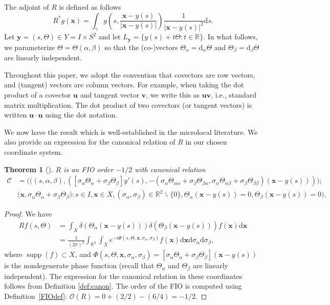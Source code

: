 \documentclass[11pt]{article}
\newcommand{\supp}{\operatorname{supp}}
\newcommand{\be}{\begin{equation}}
\newcommand{\ee}{\end{equation}}
\newcommand{\br}{\mathbb{R}}
\newcommand{\bt}{\beta}
\newcommand{\al}{\alpha}
\numberwithin{equation}{section}
\newcommand{\paren}[1]{\left(#1\right)}               %
\newcommand{\vy}{\mathbf{y}}
\newcommand{\vx}{\mathbf{x}}
\newcommand{\vv}{\mathbf{v}}
\newcommand{\vu}{\mathbf{u}}
\newtheorem{theorem}{Theorem}[section]
\theoremstyle{definition}
\newtheorem{remark}{Remark}
\begin{document}
The adjoint of $R$ is defined as follows
\be
R^*g(\vx) = \int_{\gamma} g\paren{s, \frac{\vx - y(s)}{|\vx - y(s)|}} \frac{1}{|\vx - y(s)|^2}\mathrm{d} s.
\ee
Let $\vy = (s,\Theta) \in Y = I \times S^2$ and let $L_\vy = \{y(s) + t\Theta : t\in \br\}$. In what follows, we parameterize $\Theta = \Theta(\al,\bt)$ so that the (co-)vectors 
$\Theta_\al= {\mathrm{d}_\al} \Theta$ and $\Theta_\bt= {\mathrm{d}_\bt} \Theta$ are linearly independent. 

Throughout this paper, we adopt the convention that covectors are row vectors, and (tangent) vectors are column vectors. For example, when taking the dot product of a covector $\vu$ and tangent vector $\vv$, we write this as $\vu\vv$, i.e., standard matrix multiplication. The dot product of two covectors (or tangent vectors) is written $\vu \cdot \vu$ using the dot notation.

We now have the result which is well-established in the microlocal literature. We also provide an expression for the canonical relation of $R$ in our chosen coordinate system.

\begin{theorem}[\cite{gruhl1}]\label{fio_thm}
$R$ is an FIO order $-1/2$ with canonical relation 
\be\label{CR}
\begin{split}
\mathcal{C} &= \Big(\big((s,\al,\bt),([\sigma_\al  \Theta_\al + \sigma_\bt\Theta_\bt] y'(s), -(\sigma_\al \Theta_{\al\al}+\sigma_\bt \Theta_{\bt\al},\sigma_\al \Theta_{\al\bt}+\sigma_\bt \Theta_{\bt\bt})(\vx - y(s)))\big);\\
& \big(\vx, \sigma_\al \Theta_\al + \sigma_\bt\Theta_\bt\big): s\in I,\vx\in X,(\sigma_\al ,\sigma_\bt)\in \br^2\backslash \{0\}, \Theta_\al (\vx - y(s)) = 0,   \Theta_\bt (\vx - y(s))= 0\Big).
\end{split}
\ee
\end{theorem}


\begin{proof}
We have
\be
\label{canon}
\begin{split}
Rf(s,\Theta) &= \int_{X} \delta(\Theta_\al(\vx - y(s)))\delta(\Theta_\bt(\vx - y(s))) f(\vx)\mathrm{d}\vx\\
&= \frac1{(2\pi)^2}\int_{\br^2}\int_{X} e^{-i \Phi(s,\Theta,\vx,\sigma_\al ,\sigma_\bt)} f(\vx)\mathrm{d}\vx\mathrm{d}\sigma_\al \mathrm{d}\sigma_\bt,
\end{split}
\ee
where $\supp(f)\subset X$, and $\Phi(s,\Theta,\vx,\sigma_\al ,\sigma_\bt) = [\sigma_\al \Theta_\al + \sigma_\bt \Theta_\bt](\vx - y(s))$ is the nondegenerate phase function (recall that $\Theta_\al$ and $\Theta_\bt$ are linearly independent). The expression for the canonical relation in these coordinates follows from Definition \ref{def:canon}. The order of the FIO is computed using Definition~\ref{FIOdef}: $\mathcal{O}(R) = 0+(2/2)-(6/4)=-1/2$.
\end{proof}
\end{document}
